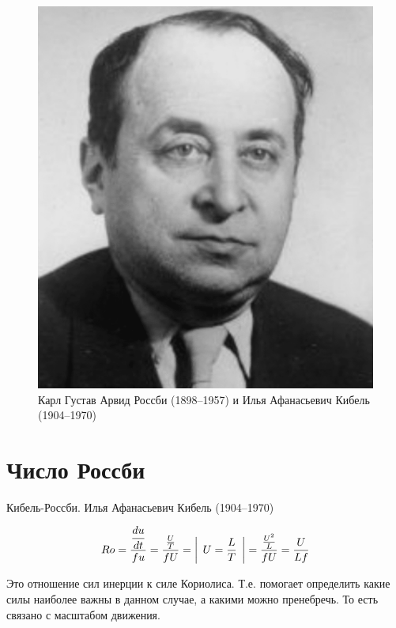 \begin{figure}
\begin{minipage}[b]{.5\textwidth}
      \includegraphics[width=1\linewidth]{pics/A_R2.png}
    \end{minipage}
    \caption{\label{fig:A_R1} Карл Густав Арвид Россби (1898--1957) и Илья Афанасьевич Кибель (1904--1970)}
    \end{figure}

\section{Число Россби} \label{A_Rossby}

Кибель-Россби. Илья Афанасьевич Кибель (1904--1970)

\begin{equation}
    \label{eq:A_Rossby}
    Ro = \frac{\displaystyle\frac{d u}{d t}}{fu} = 
        \frac{ \frac{U}{T} }{fU} = 
        \bigg| \:\: U=\frac{L}{T} \:\: \bigg| = 
        \frac{ \frac{U^2}{L} }{fU} = 
        \frac{U}{Lf}
\end{equation}

Это отношение сил инерции к силе Кориолиса. Т.е. помогает определить какие силы наиболее важны в данном случае, а какими можно пренебречь. То есть связано с масштабом движения. 

